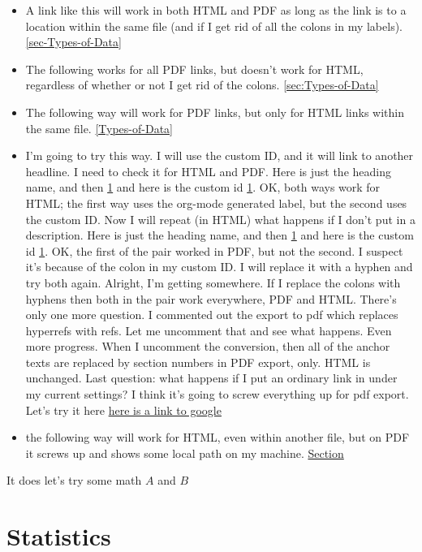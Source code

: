 \documentclass{scrbook}
\begin{document}
\begin{itemize}
\item A link like this will work in both HTML and PDF as long as the link is to a location within the same file (and if I get rid of all the colons in my labels).  \ref{sec-Types-of-Data}
\item The following works for all PDF links, but doesn't work for HTML, regardless of whether or not I get rid of the colons.   \ref{sec:Types-of-Data}
\item The following way will work for PDF links, but only for HTML links within the same file.   \ref{Types-of-Data}
\item I'm going to try this way.  I will use the custom ID, and it will link to another headline.  I need to check it for HTML and PDF.  Here is just the heading name, and then  \ref{sec-1-2} and here is the custom id  \ref{sec-1-2}.  OK, both ways work for HTML; the first way uses the org-mode generated label, but the second uses the custom ID.  Now I will repeat (in HTML) what happens if I don't put in a description.  Here is just the heading name, and then  \ref{sec-1-2} and here is the custom id  \ref{sec-1-2}.  OK, the first of the pair worked in PDF, but not the second.  I suspect it's because of the colon in my custom ID.  I will replace it with a hyphen and try both again.  Alright, I'm getting somewhere.  If I replace the colons with hyphens then both in the pair work everywhere, PDF and HTML.  There's only one more question.  I commented out the export to pdf which replaces hyperrefs with refs.  Let me uncomment that and see what happens. Even more progress.  When I uncomment the conversion, then all of the anchor texts are replaced by section numbers in PDF export, only.  HTML is unchanged.  Last question: what happens if I put an ordinary link in under my current settings?  I think it's going to screw everything up for pdf export.  Let's try it here  \href{http://www.google.com}{here is a link to google}
\item the following way will work for HTML, even within another file, but on PDF it screws up and shows some local path on my machine. \href{file:///home/jay/Desktop/git/IPSUR/data-description.org}{Section}
\end{itemize}


It does let's try some math $A$ and $B$
\section{Statistics}
\label{sec-1-2}
\label{sec-Intro-Statistics}
\end{document}
